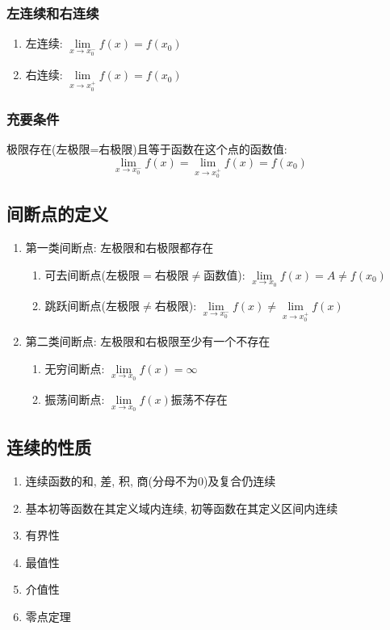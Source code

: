 \subsubsection{左连续和右连续}
\begin{enumerate}
\item 左连续: $ \lim\limits_{x \rightarrow x_{0}^{-}}f(x)=f(x_{0}) $
\item 右连续: $ \lim\limits_{x \rightarrow x_{0}^{+}}f(x)=f(x_{0}) $
\end{enumerate}
\subsubsection{充要条件}
极限存在(左极限=右极限)且等于函数在这个点的函数值:
\begin{equation*}
\lim\limits_{x \rightarrow x_{0}^{-}}f(x)=\lim\limits_{x \rightarrow x_{0}^{+}}f(x)=f(x_{0})
\end{equation*}
\subsection{间断点的定义}
\begin{enumerate}
\item 第一类间断点: 左极限和右极限都存在
\begin{enumerate}
\item 可去间断点(左极限$ = $右极限$ \neq $函数值): $ \lim\limits_{x\rightarrow x_{0}}f(x)=A\neq f(x_{0}) $
\item 跳跃间断点(左极限$ \neq $右极限): $ \lim\limits_{x\rightarrow x_{0}^{-}}f(x) \neq \lim\limits_{x\rightarrow x_{0}^{+}}f(x) $
\end{enumerate}
\item 第二类间断点: 左极限和右极限至少有一个不存在
\begin{enumerate}
\item 无穷间断点: $ \lim\limits_{x\rightarrow x_{0}}f(x)=\infty $
\item 振荡间断点: $ \lim\limits_{x\rightarrow x_{0}}f(x) $振荡不存在
\end{enumerate}
\end{enumerate}
\subsection{连续的性质}
\begin{enumerate}
\item 连续函数的和, 差, 积, 商(分母不为0)及复合仍连续
\item 基本初等函数在其定义域内连续, 初等函数在其定义区间内连续
\item 有界性
\item 最值性
\item 介值性
\item 零点定理
\end{enumerate}
